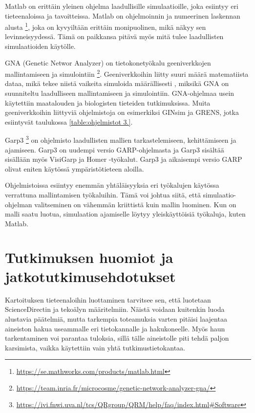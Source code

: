 \documentclass[utf8]{gradu3}
\begin{document}
Matlab on erittäin yleinen ohjelma laadullisille simulaatioille, joka esiintyy eri 
tieteenaloissa ja tavoitteissa. Matlab on ohjelmoinnin ja numeerinen laskennan alusta
\footnote{\url{https://se.mathworks.com/products/matlab.html}},
joka on kyvyiltään erittäin monipuolinen, mikä näkyy sen levinneisyydessä. 
Tämä on paikkansa pitävä myös mitä tulee laadullisten simulaatioiden käytölle.

GNA (Genetic Networ Analyzer) on tietokonetyökalu geeniverkkojen mallintamiseen 
ja simulointiin 
\footnote{\url{https://team.inria.fr/microcosme/genetic-network-analyzer-gna/}}. 
Geeniverkkoihin liitty suuri määrä matematiista dataa, mikä tekee niistä vaikeita 
simuloida määrällisesti \parencite{gnaGeneticNetworkAnalyzer2003}, miksikä
GNA on suunniteltu laadulliseen mallintamiseen ja simulointiin. GNA-ohjelmaa 
usein käytettiin maatalouden ja biologisten tieteiden tutkimuksissa.
Muita geeniverkkoihin liittyviä ohjelmistoja on esimerkiksi GINsim ja GRENS,
jotka esiintyvät taulukossa \ref{table:ohjelmistot 3.}.

Garp3 
\footnote{\url{https://ivi.fnwi.uva.nl/tcs/QRgroup/QRM/help/faq/index.html\#Software}} 
on ohjelmisto laadullisten mallien tarkastelemiseen, kehittämiseen ja 
ajamiseen. Garp3 on uudempi versio GARP-ohjelmasta ja
Garp3 sisältää sisällään myös VisiGarp ja Homer -työkalut. 
Garp3 ja aikaisempi versio GARP olivat eniten käytössä
ympäristötieteen aloilla.

Ohjelmistoissa esiintyy enemmän yhtäläisyyksia eri työkalujen käytössa verrattuna
mallintamisen työkaluihin. Tämä voi johtua siitä, että simulaatio-ohjelman
valitseminen on vähemmän kriittistä kuin mallin luominen. 
Kun on malli saatu luotua, simulaation ajamiselle löytyy yleiskäyttöisiä 
työkaluja, kuten Matlab.

\section{Tutkimuksen huomiot ja jatkotutkimusehdotukset}

Kartoituksen tieteenaloihin luottaminen tarvitsee sen, 
että luotetaan ScienceDirectin  ja tekoälyn määritelmiin. 
Näistä voidaan kuitenkin luoda alustavia päätelmiä, mutta tarkempia
toteamuksia varten pitäisi laajentaa aineiston hakua useammalle eri tietokannalle ja hakukoneelle. Myös haun tarkentaminen voi parantaa tuloksia, sillä tälle 
aineistolle piti tehdä paljon karsimista, 
vaikka käytettiin vain yhtä tutkimustietokantaa.
\end{document}
